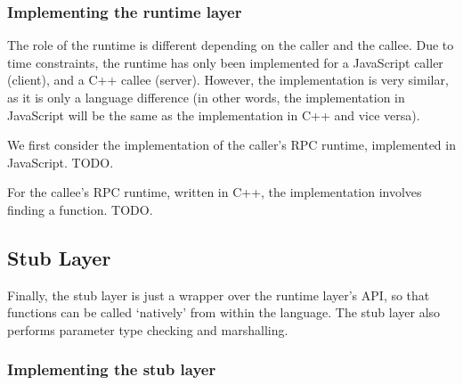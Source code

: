 \subsubsection{Implementing the runtime layer} %
\label{ssub:implementing_the_runtime_layer}
The role of the runtime is different depending on the caller and the callee. Due to time constraints, the runtime has only been implemented for a JavaScript caller (client), and a C++ callee (server). However, the implementation is very similar, as it is only a language difference (in other words, the implementation in JavaScript will be the same as the implementation in C++ and vice versa).

We first consider the implementation of the caller's RPC runtime, implemented in JavaScript. TODO.

For the callee's RPC runtime, written in C++, the implementation involves finding a function. TODO. 


\subsection{Stub Layer} %
\label{sub:stub_layer_design}
Finally, the stub layer is just a wrapper over the runtime layer's API, so that functions can be called `natively' from within the language. The stub layer also performs parameter type checking and marshalling.

\subsubsection{Implementing the stub layer} %
\label{ssub:implementing_the_stub_layer}


